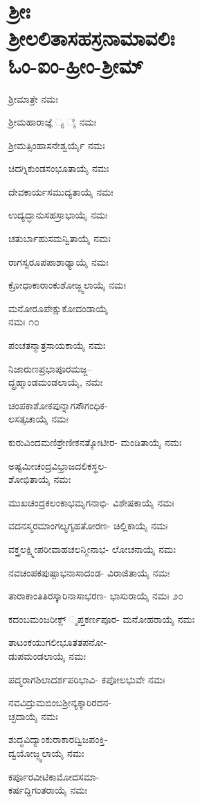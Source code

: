 
\chapter{ ಶ್ರೀಃ\\ಶ್ರೀಲಲಿತಾಸಹಸ್ರನಾಮಾವಲಿಃ​\\ಓಂ-ಐಂ-ಹ್ರೀಂ-ಶ್ರೀಮ್​}

ಶ್ರೀಮಾತ್ರೇ ನಮಃ

ಶ್ರೀಮಹಾರಾಜ್ಞೆ ್ಯ ೈ ನಮಃ

ಶ್ರೀಮತ್ಸಿಂಹಾಸನೇಶ್ವರ್ಯೈ ನಮಃ 

ಚಿದಗ್ನಿಕುಂಡಸಂಭೂತಾಯೈ ನಮಃ

ದೇವಕಾರ್ಯಸಮುದ್ಯತಾಯೈ ನಮಃ

ಉದ್ಯದ್ಭಾನುಸಹಸ್ರಾಭಾಯೈ ನಮಃ

ಚತುರ್ಬಾಹುಸಮನ್ವಿತಾಯೈ ನಮಃ

ರಾಗಸ್ವರೂಪಪಾಶಾಢ್ಯಾಯೈ ನಮಃ

ಕ್ರೋಧಾಕಾರಾಂಕುಶೋಜ್ಜ್ವಲಾಯೈ ನಮಃ

ಮನೋರೂಪೇಕ್ಷುಕೋದಂಡಾಯೈ\\ನಮಃ \num{೧೦}

ಪಂಚತನ್ಮಾತ್ರಸಾಯಕಾಯೈ ನಮಃ

ನಿಜಾರುಣಪ್ರಭಾಪೂರಮಜ್ಜ--\\ದ್ಬ್ರಹ್ಮಾಂಡಮಂಡಲಾಯೈ, ನಮಃ

ಚಂಪಕಾಶೋಕಪುನ್ನಾಗಸೌಗಂಧಿಕ-\\ಲಸತ್ಕಚಾಯೈ ನಮಃ

ಕುರುವಿಂದಮಣಿಶ್ರೇಣೀಕನತ್ಕೋಟೀರ- ಮಂಡಿತಾಯೈ ನಮಃ

ಅಷ್ಟಮೀಚಂದ್ರವಿಭ್ರಾಜದಲಿಕಸ್ಥಲ-\\ಶೋಭಿತಾಯೈ ನಮಃ

ಮುಖಚಂದ್ರಕಲಂಕಾಭಮೃಗನಾಭಿ- ವಿಶೇಷಕಾಯೈ ನಮಃ

ವದನಸ್ಮರಮಾಂಗಲ್ಯಗೃಹತೋರಣ- ಚಿಲ್ಲಿಕಾಯೈ ನಮಃ

ವಕ್ತ್ರಲಕ್ಷ್ಮೀಪರೀವಾಹಚಲನ್ಮೀನಾಭ- ಲೋಚನಾಯೈ ನಮಃ

ನವಚಂಪಕಪುಷ್ಪಾಭನಾಸಾದಂಡ- ವಿರಾಜಿತಾಯೈ ನಮಃ

ತಾರಾಕಾಂತಿತಿರಸ್ಕಾರಿನಾಸಾಭರಣ- ಭಾಸುರಾಯೈ ನಮಃ \num{೨೦}

ಕದಂಬಮಂಜರೀಕ್ಲ್ ೃಪ್ತಕರ್ಣಪೂರ- ಮನೋಹರಾಯೈ ನಮಃ

ತಾಟಂಕಯುಗಲೀಭೂತತಪನೋ-\\ಡುಪಮಂಡಲಾಯೈ ನಮಃ

ಪದ್ಮರಾಗಶಿಲಾದರ್ಶಪರಿಭಾವಿ- ಕಪೋಲಭುವೇ ನಮಃ

ನವವಿದ್ರುಮಬಿಂಬಶ್ರೀನ್ಯಕ್ಕಾರಿರದನ-\\ಚ್ಛದಾಯೈ ನಮಃ

ಶುದ್ಧವಿದ್ಯಾಂಕುರಾಕಾರದ್ವಿಜಪಂಕ್ತಿ-\\ದ್ವಯೋಜ್ಜ್ವಲಾಯೈ ನಮಃ

ಕರ್ಪೂರವೀಟಿಕಾಮೋದಸಮಾ-\\ಕರ್ಷದ್ದಿಗಂತರಾಯೈ ನಮಃ

